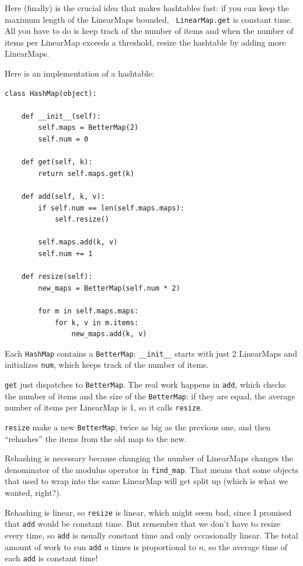\documentclass[10pt]{book}
\begin{document}
Here (finally) is the crucial idea that makes hashtables fast: if you
can keep the maximum length of the LinearMaps bounded, {\tt
  LinearMap.get} is constant time.  All you have to do is keep track
of the number of items and when the number of
items per LinearMap exceeds a threshold, resize the hashtable by
adding more LinearMaps.

Here is an implementation of a hashtable:

\begin{verbatim}
class HashMap(object):

    def __init__(self):
        self.maps = BetterMap(2)
        self.num = 0

    def get(self, k):
        return self.maps.get(k)

    def add(self, k, v):
        if self.num == len(self.maps.maps):
            self.resize()

        self.maps.add(k, v)
        self.num += 1

    def resize(self):
        new_maps = BetterMap(self.num * 2)

        for m in self.maps.maps:
            for k, v in m.items:
                new_maps.add(k, v)
\end{verbatim}

Each {\tt HashMap} contains a {\tt BetterMap}; \verb"__init__" starts
with just 2 LinearMaps and initializes {\tt num}, which keeps track of
the number of items.

{\tt get} just dispatches to {\tt BetterMap}.  The real work happens
in {\tt add}, which checks the number of items and the size of the
{\tt BetterMap}: if they are equal, the average number of items per
LinearMap is 1, so it calls {\tt resize}.

{\tt resize} make a new {\tt BetterMap}, twice as big as the previous
one, and then ``rehashes'' the items from the old map to the new.

Rehashing is necessary because changing the number of LinearMaps
changes the denominator of the modulus operator in
\verb"find_map".  That means that some objects that used
to wrap into the same LinearMap will get split up (which is
what we wanted, right?).

Rehashing is linear, so
{\tt resize} is linear, which might seem bad, since I promised
that {\tt add} would be constant time.  But remember that
we don't have to resize every time, so {\tt add} is usually
constant time and only occasionally linear.  The total amount
of work to run {\tt add} $n$ times is proportional to $n$,
so the average time of each {\tt add} is constant time!
\end{document}

